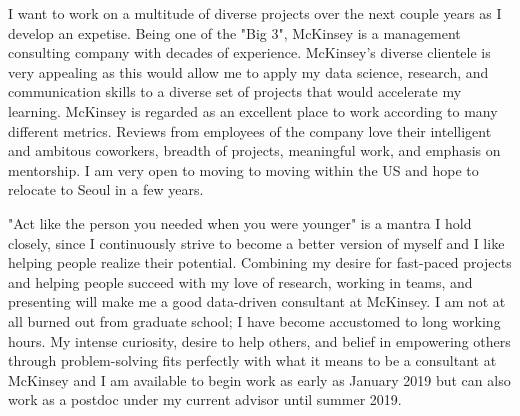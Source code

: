 \documentclass[11pt, letterpaper]{CV_latex_class}
\begin{document}
\begin{cvletter}

\hspace{1em} I want to work on a multitude of diverse projects over the next couple years as I develop an expetise. Being one of the "Big 3", McKinsey is a management consulting company with decades of experience. McKinsey's diverse clientele is very appealing as this would allow me to apply my data science, research, and communication skills to a diverse set of projects that would accelerate my learning. McKinsey is regarded as an excellent place to work according to many different metrics. Reviews from employees of the company love their intelligent and ambitous coworkers, breadth of projects, meaningful work, and emphasis on mentorship. I am very open to moving to moving within the US and hope to relocate to Seoul in a few years.



\hspace{1em} "Act like the person you needed when you were younger" is a mantra I hold closely, since I continuously strive to become a better version of myself and I like helping people realize their potential. Combining my desire for fast-paced projects and helping people succeed with my love of research, working in teams, and presenting will make me a good data-driven consultant at McKinsey. I am not at all burned out from graduate school; I have become accustomed to long working hours. My intense curiosity, desire to help others, and belief in empowering others through problem-solving fits perfectly with what it means to be a consultant at McKinsey and I am available to begin work as early as January 2019 but can also work as a postdoc under my current advisor until summer 2019.

\end{cvletter}


\makeletterclosing

\end{document}
